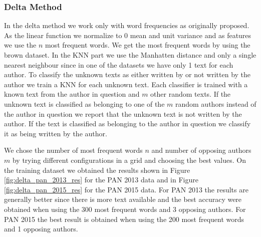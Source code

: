
\subsubsection{Delta Method}
In the delta method we work only with word frequencies as originally proposed.
As the linear function we normalize to 0 mean and unit variance and as features
we use the $n$ most frequent words. We get the most frequent words by using the
brown dataset. In the \gls{KNN} part we use the Manhatten distance and only a
single nearest neighbour since in one of the datasets we have only 1 text for
each author. To classify the unknown texts as either written by or not written
by the author we train a \gls{KNN} for each unknown text. Each classifier is
trained with a known text from the author in question and $m$ other random
texts. If the unknown text is classified as belonging to one of the $m$ random
authors instead of the author in question we report that the unknown text is not
written by the author. If the text is classified as belonging to the author in
question we classify it as being written by the author.

We chose the number of most frequent words $n$ and number of opposing
authors $m$ by trying different configurations in a grid and choosing the
best values. On the training dataset we obtained the results shown in
Figure \ref{fig:delta_pan_2013_res} for the PAN 2013 data and in Figure
\ref{fig:delta_pan_2015_res} for the PAN 2015 data. For PAN 2013 the results are
generally better since there is more text available and the best accuracy were
obtained when using the 300 most frequent words and 3 opposing authors. For PAN
2015 the best result is obtained when using the 200 most frequent words and 1
opposing authors.

